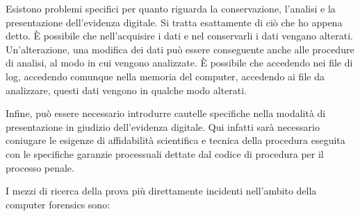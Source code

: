Esistono problemi specifici per quanto riguarda la conservazione, l'analisi e la presentazione dell'evidenza digitale. Si tratta esattamente di ciò che ho appena detto. È possibile che nell'acquisire i dati e nel conservarli i dati vengano alterati. Un'alterazione, una modifica dei dati può essere conseguente anche alle procedure di analisi, al modo in cui vengono analizzate. È possibile che accedendo nei file di log, accedendo comunque nella memoria del computer, accedendo ai file da analizzare, questi dati vengono in qualche modo alterati. 

Infine, può essere necessario introdurre cautelle specifiche nella modalità di presentazione in giudizio dell'evidenza digitale. Qui infatti sarà necessario coniugare le esigenze di affidabilità scientifica e tecnica della procedura eseguita con le specifiche garanzie processuali dettate dal codice di procedura per il processo penale. 

I mezzi di ricerca della prova più direttamente incidenti nell'ambito della computer forensics sono:

